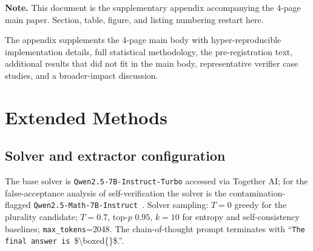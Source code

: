 \documentclass{article}
\begin{document}

\printAffiliationsAndNotice{}

\onecolumn

\noindent\textbf{Note.} This document is the supplementary appendix accompanying the 4-page main paper. Section, table, figure, and listing numbering restart here.
\vspace{1em}

\setcounter{section}{0}
\renewcommand{\thesection}{\Alph{section}}
\renewcommand{\thetable}{\Alph{section}.\arabic{table}}
\renewcommand{\thefigure}{\Alph{section}.\arabic{figure}}
\setcounter{table}{0}
\setcounter{figure}{0}


The appendix supplements the 4-page main body with hyper-reproducible implementation
details, full statistical methodology, the pre-registration text, additional
results that did not fit in the main body, representative verifier
case studies, and a broader-impact discussion.

\section{Extended Methods}
\label{app:methods}

\subsection{Solver and extractor configuration}
\label{app:models}

The base solver is \texttt{Qwen2.5-7B-Instruct-Turbo} accessed via Together AI; for the false-acceptance analysis of self-verification the solver is the contamination-flagged \texttt{Qwen2.5-Math-7B-Instruct}~\citep{wu2025contam}. Solver sampling: $T{=}0$ greedy for the plurality candidate; $T{=}0.7$, top-$p$ $0.95$, $k{=}10$ for entropy and self-consistency baselines; \texttt{max\_tokens}{=}2048. The chain-of-thought prompt terminates with ``\texttt{The final answer is}~\$\textbackslash boxed\{\}\$.''.
\end{document}
